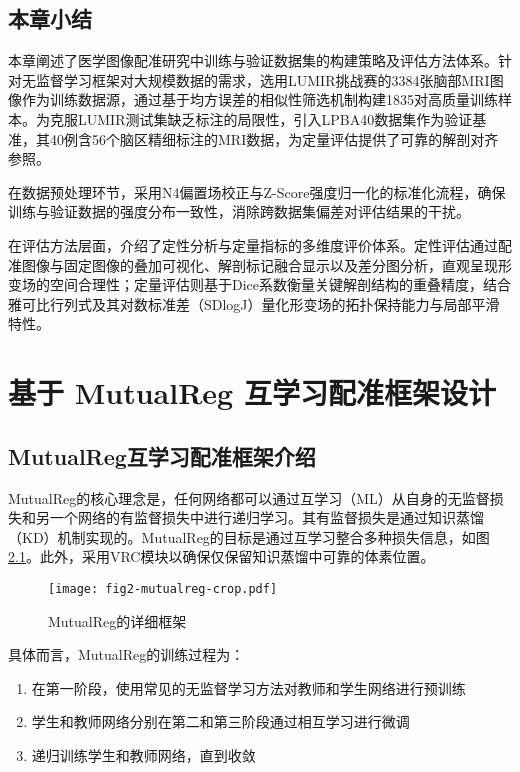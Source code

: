 \section{本章小结}

本章阐述了医学图像配准研究中训练与验证数据集的构建策略及评估方法体系。针对无监督学习框架对大规模数据的需求，选用LUMIR挑战赛的3384张脑部MRI图像作为训练数据源，通过基于均方误差的相似性筛选机制构建1835对高质量训练样本。为克服LUMIR测试集缺乏标注的局限性，引入LPBA40数据集作为验证基准，其40例含56个脑区精细标注的MRI数据，为定量评估提供了可靠的解剖对齐参照。

在数据预处理环节，采用N4偏置场校正与Z-Score强度归一化的标准化流程，确保训练与验证数据的强度分布一致性，消除跨数据集偏差对评估结果的干扰。

在评估方法层面，介绍了定性分析与定量指标的多维度评价体系。定性评估通过配准图像与固定图像的叠加可视化、解剖标记融合显示以及差分图分析，直观呈现形变场的空间合理性；定量评估则基于Dice系数衡量关键解剖结构的重叠精度，结合雅可比行列式及其对数标准差（SDlogJ）量化形变场的拓扑保持能力与局部平滑特性。


\chapter{基于 MutualReg 互学习配准框架设计}

\section{MutualReg互学习配准框架介绍}

MutualReg的核心理念是，任何网络都可以通过互学习（ML）从自身的无监督损失和另一个网络的有监督损失中进行递归学习。其有监督损失是通过知识蒸馏（KD）机制实现的。MutualReg的目标是通过互学习整合多种损失信息，如图\ref{fig:2}。此外，采用VRC模块以确保仅保留知识蒸馏中可靠的体素位置。

\begin{figure}[h]
    \centering
    \texttt{[image: fig2-mutualreg-crop.pdf]}
    \caption{MutualReg的详细框架}
    \label{fig:2}
\end{figure}

具体而言，MutualReg的训练过程为：

\begin{enumerate}
    \item 在第一阶段，使用常见的无监督学习方法对教师和学生网络进行预训练
    \item 学生和教师网络分别在第二和第三阶段通过相互学习进行微调
    \item 递归训练学生和教师网络，直到收敛
\end{enumerate}


